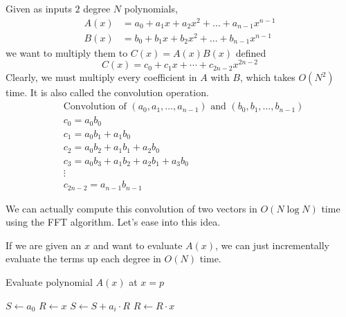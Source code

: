 \documentclass{article}
\begin{document}
    Given as inputs $2$ degree $N$ polynomials, 
    \begin{align}
      A(x) & = a_0 + a_1x + a_2x^2 + \ldots + a_{n-1}x^{n-1} \\
      B(x) & = b_0 + b_1x + b_2x^2 + \ldots + b_{n-1}x^{n-1} 
    \end{align}
    we want to multiply them to $C(x) = A (x) B(x)$ defined 
    \begin{equation}
      C(x) = c_0 + c_1x + \cdots + c_{2n-2}x^{2n-2} 
    \end{equation}
    Clearly, we must multiply every coefficient in $A$ with $B$, which takes $O(N^2)$ time. It is also called the convolution operation. 
    \begin{align*}
      &\text{Convolution of } (a_0, a_1, \ldots, a_{n-1}) \text{ and } (b_0, b_1, \ldots, b_{n-1}) \\[1em]
      &c_0 = a_0 b_0 \\
      &c_1 = a_0 b_1 + a_1 b_0 \\
      &c_2 = a_0 b_2 + a_1 b_1 + a_2 b_0 \\
      &c_3 = a_0 b_3 + a_1 b_2 + a_2 b_1 + a_3 b_0 \\
      &\vdots \\
      &c_{2n-2} = a_{n-1} b_{n-1}
    \end{align*}

    We can actually compute this convolution of two vectors in $O(N \log{N})$ time using the FFT algorithm. Let's ease into this idea. 

    \begin{lemma}
      If we are given an $x$ and want to evaluate $A(x)$, we can just incrementally evaluate the terms up each degree in $O(N)$ time. 

      \begin{algorithm}[H]
        \caption{Evaluate polynomial $A(x)$ at $x=p$}
        \begin{algorithmic}[1]
        \State $S \gets a_0$
        \State $R \gets x$
            \State $S \gets S + a_i \cdot R$
            \State $R \gets R \cdot x$
        \EndFor
        \end{algorithmic}
      \end{algorithm}
    \end{lemma}
\end{document}
